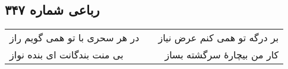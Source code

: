 \begin{center}
\section*{رباعی شماره ۳۴۷}
\label{sec:sh347}
\begin{longtable}{l p{0.5cm} r}
در هر سحری با تو همی گویم راز
&&
بر درگه تو همی کنم عرض نیاز
\\
بی منت بندگانت ای بنده نواز
&&
کار من بیچارهٔ سرگشته بساز
\\
\end{longtable}
\end{center}
